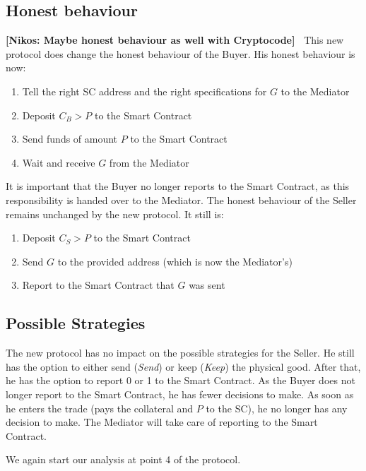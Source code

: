 \documentclass{cacthesis}
\newcommand{\authnote}[3]{{ \footnotesize \textbf{#1[#2: #3]~}}}
\newcommand{\niknote}[1]{\authnote{\color{red}}{Nikos}{#1}}
\begin{document}
\subsection{Honest behaviour}
\niknote{Maybe honest behaviour as well with Cryptocode}
This new protocol does change the honest behaviour of the Buyer. His honest behaviour is now:
\begin{enumerate}
    \item Tell the right SC address and the right specifications for $G$ to the Mediator
    \item Deposit $C_B>P$ to the Smart Contract
    \item Send funds of amount $P$ to the Smart Contract
    \item Wait and receive $G$ from the Mediator
\end{enumerate}
It is important that the Buyer no longer reports to the Smart Contract, as this responsibility is handed over to the Mediator.\newline
The honest behaviour of the Seller remains unchanged by the new protocol. It still is:
\begin{enumerate}
    \item Deposit $C_S>P$ to the Smart Contract
    \item Send $G$ to the provided address (which is now the Mediator's)
    \item Report to the Smart Contract  that $G$ was sent
\end{enumerate}

\subsection{Possible Strategies}
The new protocol has no impact on the possible strategies for the Seller. He still has the option to either send (\emph{Send}) or keep (\emph{Keep}) the physical good. After that, he has the option to report 0 or 1 to the Smart Contract.
As the Buyer does not longer report to the Smart Contract, he has fewer decisions to make. As soon as he enters the trade (pays the collateral and $P$ to the SC), he no longer has any decision to make. The Mediator will take care of reporting to the Smart Contract.

We again start our analysis at point 4 of the protocol.\newline
\end{document}
